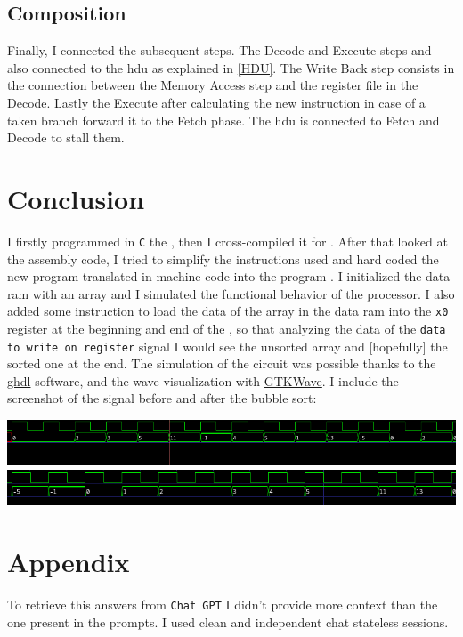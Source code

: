 \documentclass{article}
\begin{document}
\subsection*{Composition}
Finally, I connected the subsequent steps. The Decode and Execute steps and also connected to the \acrshort{hdu} as explained in \ref{HDU}.
The Write Back step consists in the connection between the Memory Access step and the register file in the Decode. 
Lastly the Execute after calculating the new instruction in case of a taken branch forward it to the Fetch phase.
The \acrshort{hdu} is connected to Fetch and Decode to \gls{stall} them.



\section{Conclusion}
I firstly programmed in \texttt{C} the \sort, then I cross-compiled it for \RISCV. After that looked at the assembly code, I tried to simplify
the instructions used and hard coded the new program translated in machine code into the program \ROM. I initialized the data ram with an array
and I simulated the functional behavior of the processor. I also added some instruction to load the data of the array in the data ram into the
\texttt{x0} register at the beginning and end of the \sort, so that analyzing the data of the \texttt{data to write on register} signal I would
see the unsorted array and [hopefully] the sorted one at the end. The simulation of the circuit was possible thanks to the 
\href{http://ghdl.free.fr/}{ghdl} software, and the wave visualization with \href{https://gtkwave.sourceforge.net/}{GTKWave}. 
I include the screenshot of the signal before and after the bubble sort:
\begin{center}
  \includegraphics[width=\textwidth,trim={0 30 0 0},clip]{inputarray.png}
  \includegraphics[width=\textwidth,trim={0 5 0 0},clip]{outputarray.png}
\end{center}


\section{Appendix}\label{prompts}
To retrieve this answers from \texttt{Chat GPT} I didn't provide more context than the one present in the prompts. 
I used clean and independent chat stateless sessions.
\end{document}
